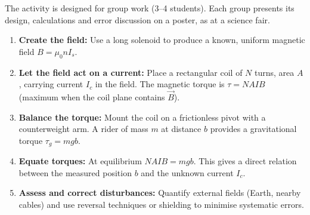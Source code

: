 \documentclass[11pt]{article}
\newcounter{popsec}
\newcounter{popsub}
\newcommand{\courssub}[1]{%
  \stepcounter{popsub}%
  \par\vspace{9pt}\noindent{\popxbold\fontsize{11.5}{13}\selectfont\color{popink}{\color{poporange}\thepopsec.\thepopsub}\hspace{6pt}#1}\par\nopagebreak\vspace{4pt}
}
\begin{document}
The activity is designed for group work (3--4 students). Each group presents its design, calculations and error discussion on a poster, as at a science fair.

\begin{methode}
\begin{enumerate}
\item \textbf{Create the field:} Use a long solenoid to produce a known, uniform magnetic field $B = \mu_0 n I_s$.
\item \textbf{Let the field act on a current:} Place a rectangular coil of $N$ turns, area $A$, carrying current $I_c$ in the field. The magnetic torque is $\tau = NAIB$ (maximum when the coil plane contains $\vec{B}$).
\item \textbf{Balance the torque:} Mount the coil on a frictionless pivot with a counterweight arm. A rider of mass $m$ at distance $b$ provides a gravitational torque $\tau_g = mgb$.
\item \textbf{Equate torques:} At equilibrium $NAIB = mgb$. This gives a direct relation between the measured position $b$ and the unknown current $I_c$.
\item \textbf{Assess and correct disturbances:} Quantify external fields (Earth, nearby cables) and use reversal techniques or shielding to minimise systematic errors.
\end{enumerate}
\end{methode}

\courssub{Situation}
\end{document}
